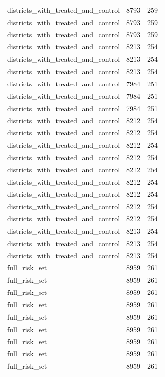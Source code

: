 \begin{table}[!htbp]
\begin{tabular}{lrr}
districts\_with\_treated\_and\_control & 8793 & 259 \\
districts\_with\_treated\_and\_control & 8793 & 259 \\
districts\_with\_treated\_and\_control & 8793 & 259 \\
districts\_with\_treated\_and\_control & 8213 & 254 \\
districts\_with\_treated\_and\_control & 8213 & 254 \\
districts\_with\_treated\_and\_control & 8213 & 254 \\
districts\_with\_treated\_and\_control & 7984 & 251 \\
districts\_with\_treated\_and\_control & 7984 & 251 \\
districts\_with\_treated\_and\_control & 7984 & 251 \\
districts\_with\_treated\_and\_control & 8212 & 254 \\
districts\_with\_treated\_and\_control & 8212 & 254 \\
districts\_with\_treated\_and\_control & 8212 & 254 \\
districts\_with\_treated\_and\_control & 8212 & 254 \\
districts\_with\_treated\_and\_control & 8212 & 254 \\
districts\_with\_treated\_and\_control & 8212 & 254 \\
districts\_with\_treated\_and\_control & 8212 & 254 \\
districts\_with\_treated\_and\_control & 8212 & 254 \\
districts\_with\_treated\_and\_control & 8212 & 254 \\
districts\_with\_treated\_and\_control & 8213 & 254 \\
districts\_with\_treated\_and\_control & 8213 & 254 \\
districts\_with\_treated\_and\_control & 8213 & 254 \\
full\_risk\_set & 8959 & 261 \\
full\_risk\_set & 8959 & 261 \\
full\_risk\_set & 8959 & 261 \\
full\_risk\_set & 8959 & 261 \\
full\_risk\_set & 8959 & 261 \\
full\_risk\_set & 8959 & 261 \\
full\_risk\_set & 8959 & 261 \\
full\_risk\_set & 8959 & 261 \\
full\_risk\_set & 8959 & 261 \\

\end{tabular}
\end{table}
